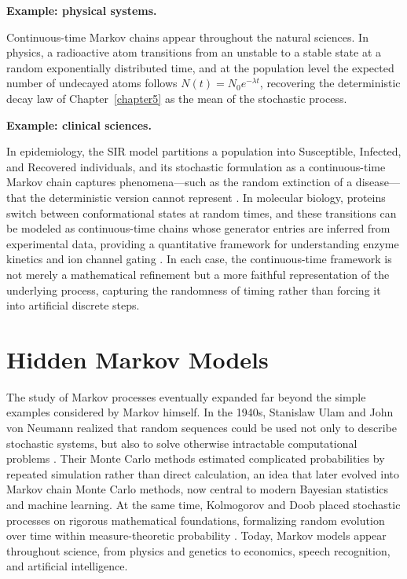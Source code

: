 \medskip

\textbf{Example: physical systems.} 

\medskip

Continuous-time Markov chains appear throughout the natural sciences. In physics, a radioactive atom transitions from an unstable to a stable state at a random exponentially distributed time, and at the population level the expected number of undecayed atoms follows $N(t) = N_0 e^{-\lambda t}$, recovering the deterministic decay law of Chapter~\ref{chapter5} as the mean of the stochastic process. 

\medskip

\textbf{Example: clinical sciences.}

\medskip

In epidemiology, the SIR model partitions a population into Susceptible, Infected, and Recovered individuals, and its stochastic formulation as a continuous-time Markov chain captures phenomena---such as the random extinction of a disease---that the deterministic version cannot represent \cite{kermack_1927_sir}. In molecular biology, proteins switch between conformational states at random times, and these transitions can be modeled as continuous-time chains whose generator entries are inferred from experimental data, providing a quantitative framework for understanding enzyme kinetics and ion channel gating \cite{qian_2008_biophy}. In each case, the continuous-time framework is not merely a mathematical refinement but a more faithful representation of the underlying process, capturing the randomness of timing rather than forcing it into artificial discrete steps.

\section{Hidden Markov Models}

The study of Markov processes eventually expanded far beyond the simple examples considered by Markov himself. In the 1940s, Stanislaw Ulam and John von Neumann realized that random sequences could be used not only to describe stochastic systems, but also to solve otherwise intractable computational problems \cite{ulam_1976_adventures, metropolis_1949_monte}. Their Monte Carlo methods estimated complicated probabilities by repeated simulation rather than direct calculation, an idea that later evolved into Markov chain Monte Carlo methods, now central to modern Bayesian statistics and machine learning. At the same time, Kolmogorov and Doob placed stochastic processes on rigorous mathematical foundations, formalizing random evolution over time within measure-theoretic probability \cite{kolmogorov_1933_grundbegriffe, doob_1953_stochastic}. Today, Markov models appear throughout science, from physics and genetics to economics, speech recognition, and artificial intelligence.

